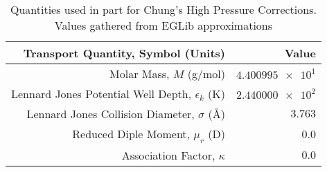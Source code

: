 \begin{table}[!h]
\caption{Quantities used in part for Chung's High Pressure Corrections. Values gathered from EGLib approximations \cite{ERN1995105}}
\label{transport-coeffs-other}
\begin{center}
\begin{tabular}{ r || r }
Transport Quantity, Symbol (Units)& Value  \\
\hline
Molar Mass, $M$ (g/mol) & $\num{4.400995e1}$  \\
Lennard Jones Potential Well Depth, $\epsilon_k$ (K)& $\num{2.440000e2}$  \\
Lennard Jones Collision Diameter, $\sigma$ (\AA) & $3.763$  \\
Reduced Diple Moment, $\mu_r$ (D) & $0.0$  \\
Association Factor, $\kappa$ & $0.0$
\end{tabular}
\end{center}
\end{table}



